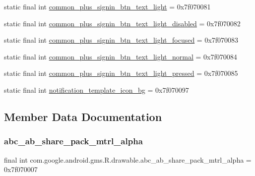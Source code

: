 \begin{DoxyCompactItemize}
\item 
static final int \mbox{\hyperlink{classcom_1_1google_1_1android_1_1gms_1_1R_1_1drawable_a3a924b73861100c55cb79cd9051fc418}{common\+\_\+plus\+\_\+signin\+\_\+btn\+\_\+text\+\_\+light}} = 0x7f070081
\item 
static final int \mbox{\hyperlink{classcom_1_1google_1_1android_1_1gms_1_1R_1_1drawable_a9d6b15e8b3751f4760918f14384a6759}{common\+\_\+plus\+\_\+signin\+\_\+btn\+\_\+text\+\_\+light\+\_\+disabled}} = 0x7f070082
\item 
static final int \mbox{\hyperlink{classcom_1_1google_1_1android_1_1gms_1_1R_1_1drawable_a68cdb2b42bd5f8dd7a48be2e68a15496}{common\+\_\+plus\+\_\+signin\+\_\+btn\+\_\+text\+\_\+light\+\_\+focused}} = 0x7f070083
\item 
static final int \mbox{\hyperlink{classcom_1_1google_1_1android_1_1gms_1_1R_1_1drawable_ab7dcde5f15dbead583f86bf86bf0140c}{common\+\_\+plus\+\_\+signin\+\_\+btn\+\_\+text\+\_\+light\+\_\+normal}} = 0x7f070084
\item 
static final int \mbox{\hyperlink{classcom_1_1google_1_1android_1_1gms_1_1R_1_1drawable_adfa9f8c9c812ef3f7d90353cc0a30c3c}{common\+\_\+plus\+\_\+signin\+\_\+btn\+\_\+text\+\_\+light\+\_\+pressed}} = 0x7f070085
\item 
static final int \mbox{\hyperlink{classcom_1_1google_1_1android_1_1gms_1_1R_1_1drawable_adf768813b72464328c9cd98b03bb72c8}{notification\+\_\+template\+\_\+icon\+\_\+bg}} = 0x7f070097
\end{DoxyCompactItemize}


\subsection{Member Data Documentation}
\mbox{\label{classcom_1_1google_1_1android_1_1gms_1_1R_1_1drawable_a1cf756e70f44091b2a22e3ad796cdd0d}} 
\subsubsection{\texorpdfstring{abc\+\_\+ab\+\_\+share\+\_\+pack\+\_\+mtrl\+\_\+alpha}{abc\_ab\_share\_pack\_mtrl\_alpha}}
{\footnotesize\ttfamily final int com.\+google.\+android.\+gms.\+R.\+drawable.\+abc\+\_\+ab\+\_\+share\+\_\+pack\+\_\+mtrl\+\_\+alpha = 0x7f070007\hspace{0.3cm}{\ttfamily [static]}}

